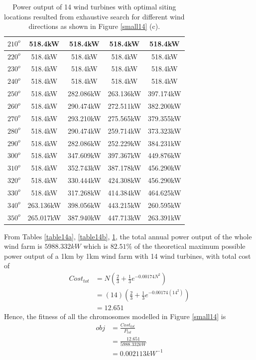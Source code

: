 \begin{table}[H]
\begin{tabular}{|c|c|c|c|c|}
        		$210^o$	& 518.4kW	& 518.4kW	& 518.4kW	& 518.4kW	\\ \hline
        		$220^o$	& 518.4kW	& 518.4kW	& 518.4kW	& 518.4kW	\\ \hline
        		$230^o$	& 518.4kW	& 518.4kW	& 518.4kW	& 518.4kW	\\ \hline
        		$240^o$	& 518.4kW	& 518.4kW	& 518.4kW	& 518.4kW	\\ \hline
        		$250^o$	& 518.4kW	& 282.086kW	& 263.136kW	& 397.174kW	\\ \hline
        		$260^o$	& 518.4kW	& 290.474kW	& 272.511kW	& 382.200kW	\\ \hline
        		$270^o$	& 518.4kW	& 293.210kW	& 275.565kW	& 379.355kW	\\ \hline
        		$280^o$	& 518.4kW	& 290.474kW	& 259.714kW	& 373.323kW	\\ \hline
        		$290^o$	& 518.4kW	& 282.086kW	& 252.229kW	& 384.231kW	\\ \hline
        		$300^o$	& 518.4kW	& 347.609kW	& 397.367kW	& 449.876kW	\\ \hline
        		$310^o$	& 518.4kW	& 352.743kW	& 387.178kW	& 456.290kW	\\ \hline
        		$320^o$	& 518.4kW	& 330.444kW	& 424.308kW	& 456.290kW	\\ \hline
        		$330^o$	& 518.4kW	& 317.268kW	& 414.384kW	& 464.625kW	\\ \hline
        		$340^o$	& 263.136kW	& 398.056kW	& 443.215kW	& 260.595kW	\\ \hline
        		$350^o$	& 265.017kW	& 387.940kW	& 447.713kW	& 263.391kW	\\ \hline
        	\end{tabular}
        	\caption{Power output of 14 wind turbines with optimal siting locations resulted from exhaustive search for different wind directions as shown in Figure \ref{small14} (c).}
        	\label{table14c}
        \end{table}
        \doublespacing
        
        From Tables \ref{table14a}, \ref{table14b}, \ref{table14c}, the total annual power output of the whole wind farm is $5988.332kW$ which is $82.51\%$ of the theoretical maximum possible power output of a 1km by 1km wind farm with 14 wind turbines, with total cost of
        \begin{align*}
            Cost_{tot}
            &= N\left(\frac{2}{3} + \frac{1}{3}e^{-0.00174N^2}\right) \\
            &= \left(14\right)\left(\frac{2}{3} + \frac{1}{3}e^{-0.00174\left(14^2\right)}\right) \\
            &=12.651
        \end{align*}
        Hence, the fitness of all the chromosomes modelled in Figure \ref{small14} is
        \begin{align*}
            obj
            &=\frac{Cost_{tot}}{P_{tot}} \\
            &=\frac{12.651}{5988.332kW} \\
            &=0.002113kW^{-1}
        \end{align*}
        
